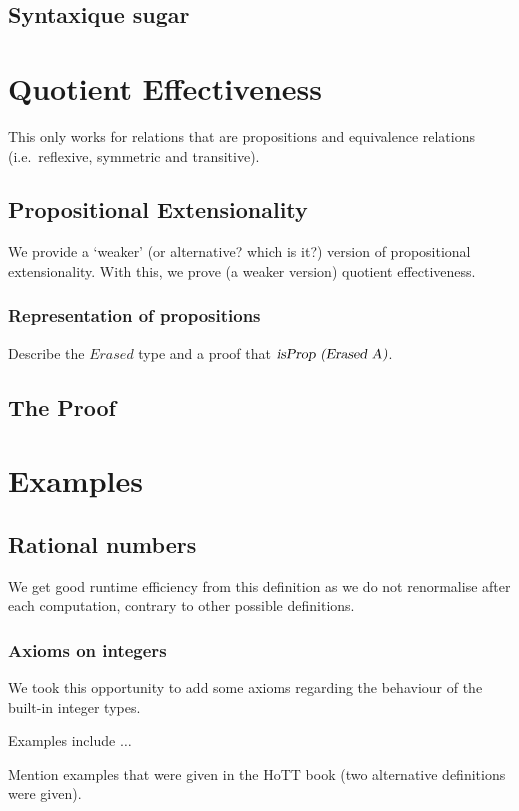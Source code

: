 \documentclass[11pt]{article}
\newcommand\id[1] {\textsl{#1}}
\begin{document}
\subsection{Syntaxique sugar}

\section{Quotient Effectiveness}
This only works for relations that are propositions and equivalence relations (i.e.\ reflexive, symmetric and transitive).
\subsection{Propositional Extensionality}
We provide a `weaker' (or alternative? which is it?) version of propositional extensionality. With this, we prove (a weaker version) quotient effectiveness.

\subsubsection{Representation of propositions}
Describe the $Erased$ type and a proof that $\id{isProp (Erased A)}$.

\subsection{The Proof}

\section{Examples}
\subsection{Rational numbers}
We get good runtime efficiency from this definition as we do not renormalise after each computation, contrary to other possible definitions.

\subsubsection{Axioms on integers}

We took this opportunity to add some axioms regarding the behaviour of the built-in integer types. 

Examples include $\ldots$

Mention examples that were given in the HoTT book (two alternative definitions were given).
\end{document}
